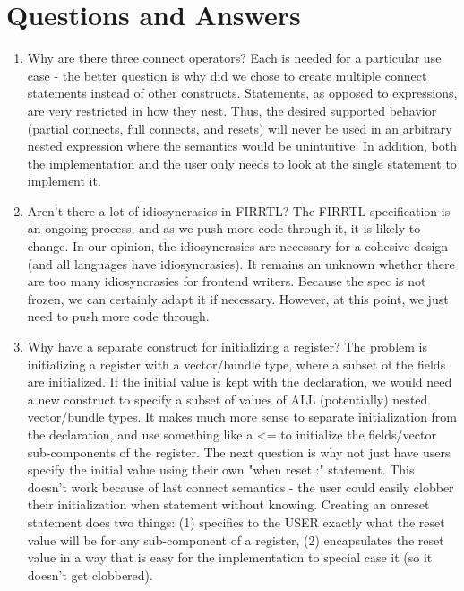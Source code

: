\documentclass[12pt]{article}
\begin{document}
\section{Questions and Answers}
\begin{enumerate}[topsep=3pt,itemsep=-0.5ex,partopsep=1ex,parsep=1ex]
\item Why are there three connect operators?
Each is needed for a particular use case - the better question is why did we chose to create multiple connect statements instead of other constructs.
Statements, as opposed to expressions, are very restricted in how they nest.
Thus, the desired supported behavior (partial connects, full connects, and resets) will never be used in an arbitrary nested expression where the semantics would be unintuitive.
In addition, both the implementation and the user only needs to look at the single statement to implement it.

\item Aren't there a lot of idiosyncrasies in FIRRTL?
The FIRRTL specification is an ongoing process, and as we push more code through it, it is likely to change.
In our opinion, the idiosyncrasies are necessary for a cohesive design (and all languages have idiosyncrasies).
It remains an unknown whether there are too many idiosyncrasies for frontend writers.
Because the spec is not frozen, we can certainly adapt it if necessary.
However, at this point, we just need to push more code through.

\item Why have a separate construct for initializing a register?
The problem is initializing a register with a vector/bundle type, where a subset of the fields are initialized.
If the initial value is kept with the declaration, we would need a new construct to specify a subset of values of ALL (potentially) nested vector/bundle types.
It makes much more sense to separate initialization from the declaration, and use something like a <= to initialize the fields/vector sub-components of the register.
The next question is why not just have users specify the initial value using their own "when reset :" statement.
This doesn't work because of last connect semantics - the user could easily clobber their initialization when statement without knowing.
Creating an onreset statement does two things: (1) specifies to the USER exactly what the reset value will be for any sub-component of a register, (2) encapsulates the reset value in a way that is easy for the implementation to special case it (so it doesn't get clobbered).


\end{enumerate}
\end{document}

